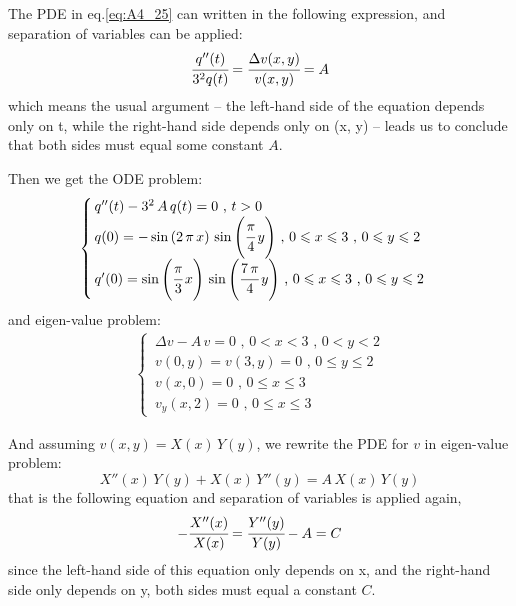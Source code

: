 \documentclass[../main.tex]{subfiles}
\begin{document}
The PDE in eq.\ref{eq:A4_25} can written in the following expression, and separation of variables can be applied:
\begin{equation} \label{eq:A4_26}
    \cfrac{q''(t)}{3^2 q(t)} = \cfrac{\Delta v(x, y)}{v(x, y)} = A
\end{equation}
which means the usual argument -- the left-hand side of the equation depends only on t, while the right-hand side depends only on (x, y) -- leads us to conclude that both sides must equal some constant $A$.

Then we get the ODE problem:
\begin{align}
    \begin{cases} \label{eq:A4_27}
        \, q''(t) - 3^2 \, A \, q(t) = 0 \text{ ,  } t > 0 \\
        \, q(0) = - \sin{(2 \, \pi \, x)} \, \sin{\left(\cfrac{\pi}{4} \, y \right)} \text{ ,  } 0 \leqslant x \leqslant 3 \text{ ,  } 0 \leqslant y \leqslant 2 \\
        \, q'(0) = \sin{\left(\cfrac{\pi}{3} \, x \right)} \, \sin{\left(\cfrac{7 \, \pi}{4} \, y \right)} \text{ ,  } 0 \leqslant x \leqslant 3 \text{ ,  } 0 \leqslant y \leqslant 2
    \end{cases}
\end{align}
and eigen-value problem:
\begin{align}
    \begin{cases} \label{eq:A4_28}
        \, \Delta v - A \, v = 0 \text{ ,  } 0 < x < 3 \text{ ,  } 0 < y < 2 \\
        \, v(0, y) = v(3, y) = 0 \text{ ,  } 0 \leqslant y \leqslant 2 \\
        \, v(x, 0) = 0 \text{ ,  } 0 \leqslant x \leqslant 3 \\
        \, v_y(x, 2) = 0 \text{ ,  } 0 \leqslant x \leqslant 3
    \end{cases}
\end{align}

And assuming $v(x, y) = X(x) \, Y(y)$, we rewrite the PDE for $v$ in eigen-value problem:
\begin{equation} \label{eq:A4_29}
    X''(x) \, Y(y) + X(x) \, Y''(y) = A \, X(x) \, Y(y)
\end{equation}
that is the following equation and separation of variables is applied again,
\begin{equation} \label{eq:A4_30}
    - \cfrac{X''(x)}{X(x)} = \cfrac{Y''(y)}{Y(y)} - A = C
\end{equation}
since the left-hand side of this equation only depends on x, and the right-hand side only depends on y, both sides must equal a constant $C$.
\end{document}
